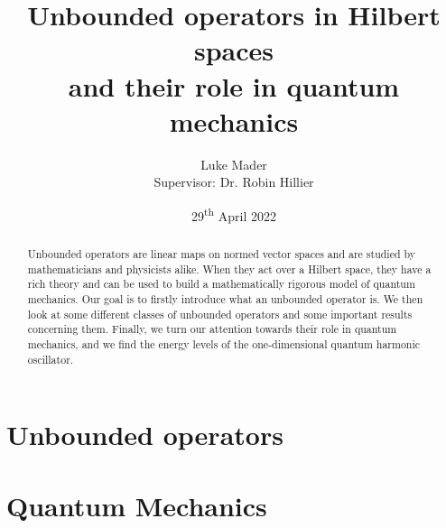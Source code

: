 \documentclass[12pt]{article}
\title{Unbounded operators in Hilbert spaces \\and their role in quantum mechanics}
\author{Luke Mader\\[.1cm]{\small Supervisor: Dr. Robin Hillier}}
\date{{\small 29\textsuperscript{th} April 2022}}
\begin{document}
\begin{figure}
\end{figure}

\maketitle

\begin{abstract}
  Unbounded operators are linear maps on normed vector spaces and are studied by mathematicians and physicists alike. When they act over a Hilbert space, they have a rich theory and can be used to build a mathematically rigorous model of quantum mechanics. Our goal is to firstly introduce what an unbounded operator is. We then look at some different classes of unbounded operators and some important results concerning them. Finally, we turn our attention towards their role in quantum mechanics, and we find the energy levels of the one-dimensional quantum harmonic oscillator.
\end{abstract}

\tableofcontents


%

\section{Unbounded operators}




\section{Quantum Mechanics}
\end{document}
